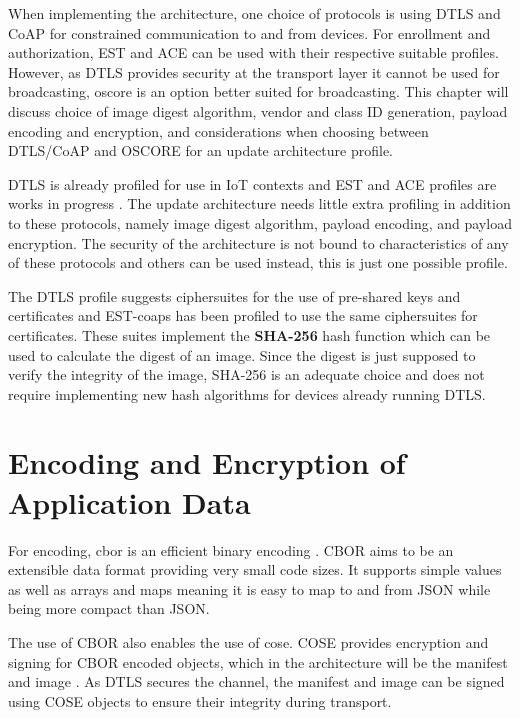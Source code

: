 \documentclass[0-thesis.tex]{subfiles}
\begin{document}
\label{chap:profiles}
When implementing the architecture, one choice of protocols is using DTLS and CoAP for
constrained communication to and from devices. For enrollment and authorization, EST and
ACE can be used with their respective suitable profiles. However, as DTLS provides
security at the transport layer it cannot be used for broadcasting, \gls{oscore} is an
option better suited for broadcasting. This chapter will discuss choice of image digest
algorithm, vendor and class ID generation, payload encoding and encryption, and
considerations when choosing between DTLS/CoAP and OSCORE for an update architecture
profile.

DTLS is already profiled for use in IoT contexts and EST and ACE profiles are works in
progress \parencite{rfc7925, est-coaps, ace-dtls-profile}. The update architecture needs
little extra profiling in addition to these protocols, namely image digest algorithm,
payload encoding, and payload encryption. The security of the architecture is not bound to
characteristics of any of these protocols and others can be used instead, this is just one
possible profile.

The DTLS profile suggests ciphersuites for the use of pre-shared keys and certificates and
EST-coaps has been profiled to use the same ciphersuites for certificates. These suites
implement the \textbf{SHA-256} hash function which can be used to calculate the digest of
an image. Since the digest is just supposed to verify the integrity of the image, SHA-256
is an adequate choice and does not require implementing new hash algorithms for devices
already running DTLS.


\section{Encoding and Encryption of Application Data}
\label{sec:encoding-encryption}
For encoding, \gls{cbor} is an efficient binary encoding \parencite{rfc7049}. CBOR aims to
be an extensible data format providing very small code sizes. It supports simple values as
well as arrays and maps meaning it is easy to map to and from JSON while being more
compact than JSON. 

The use of CBOR also enables the use of \gls{cose}. COSE provides encryption and signing
for CBOR encoded objects, which in the architecture will be the manifest and image
\parencite{rfc8152}. As DTLS secures the channel, the manifest and image can be signed
using COSE objects to ensure their integrity during transport. 
\end{document}

